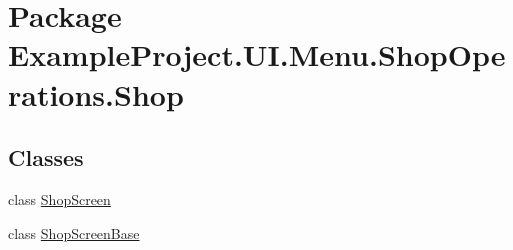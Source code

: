 \hypertarget{namespace_example_project_1_1_u_i_1_1_menu_1_1_shop_operations_1_1_shop}{}\section{Package Example\+Project.\+U\+I.\+Menu.\+Shop\+Operations.\+Shop}
\label{namespace_example_project_1_1_u_i_1_1_menu_1_1_shop_operations_1_1_shop}
\subsection*{Classes}
\begin{DoxyCompactItemize}
\item 
class \hyperlink{class_example_project_1_1_u_i_1_1_menu_1_1_shop_operations_1_1_shop_1_1_shop_screen}{Shop\+Screen}
\item 
class \hyperlink{class_example_project_1_1_u_i_1_1_menu_1_1_shop_operations_1_1_shop_1_1_shop_screen_base}{Shop\+Screen\+Base}
\end{DoxyCompactItemize}
